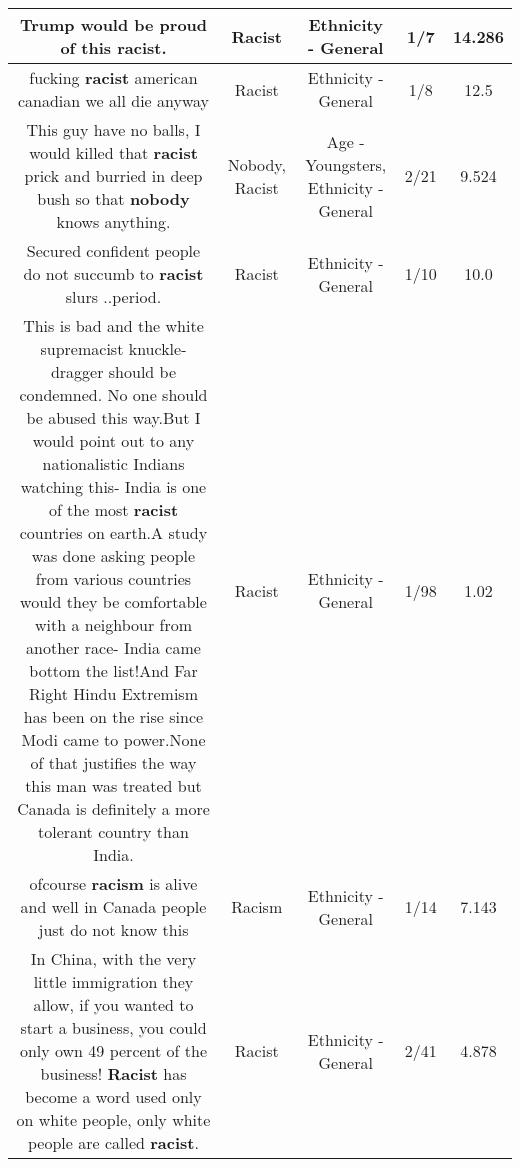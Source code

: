 \documentclass[11pt]{article}
\newlength\mylength
\begin{document}
\begin{center}
\begin{longtable}{|C{.65\mylength}|C{.30\mylength}|C{.12\mylength}|C{.12\mylength}|C{.12\mylength}|}
  \small Trump would be proud of this \textbf{racist}.\normalsize   & Racist & Ethnicity - General & 1/7 & 14.286 \\  \hline
  \small fucking \textbf{racist} american canadian we all die anyway\normalsize   & Racist & Ethnicity - General & 1/8 & 12.5 \\  \hline
  \small This guy have no balls, I would killed that \textbf{racist} prick and burried in deep bush so that \textbf{nobody} knows anything.\normalsize   & Nobody, Racist & Age - Youngsters, Ethnicity - General & 2/21 & 9.524 \\  \hline
  \small Secured confident people do not succumb to \textbf{racist} slurs  ..period.\normalsize   & Racist & Ethnicity - General & 1/10 & 10.0 \\  \hline
  \small This is bad and the white supremacist knuckle-dragger should be condemned. No one should be abused this way.But I would point out to any nationalistic Indians watching this- India is one of the most \textbf{racist} countries on earth.A study was done asking people from various countries would they be comfortable with a neighbour from another race- India came bottom the list!And Far Right Hindu Extremism has been on the rise since Modi came to power.None of that justifies the way this man was treated but Canada is definitely a more tolerant country than India.\normalsize   & Racist & Ethnicity - General & 1/98 & 1.02 \\  \hline
  \small ofcourse \textbf{racism} is alive and well in Canada people just do not know this\normalsize   & Racism & Ethnicity - General & 1/14 & 7.143 \\  \hline
  \small In China,   with the very little immigration they allow,  if you wanted to start a business,  you could only own 49 percent of the business!    \textbf{Racist} has become a word used only on white people,  only white people are called \textbf{racist}.\normalsize   & Racist & Ethnicity - General & 2/41 & 4.878 \\  \hline

\end{longtable}
\end{center}
\end{document}
